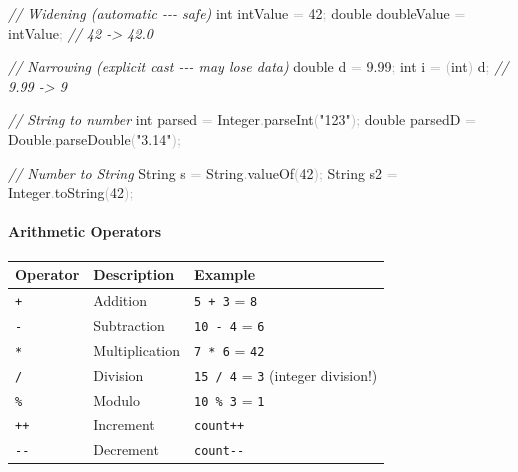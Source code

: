 \documentclass[
  justified,
  openright,
]{tufte-book}
\let\subsection\paragraph
\let\paragraph\paragraph
\newcommand{\StringTok}[1]{\textcolor{CodeString}{#1}}              %
\newcommand{\CommentTok}[1]{\textcolor{CodeComment}{\textit{#1}}}  %
\newcommand{\CodeNumTok}[1]{\textcolor{CodeNumber}{#1}}             %
\newcommand{\CodeFuncTok}[1]{\textcolor{CodeKeyword}{#1}}           %
\newcommand{\CodeTypeTok}[1]{\textcolor{CodeType}{#1}}              %
\newcommand{\OperatorTok}[1]{\textcolor{DarkGray}{#1}}              %
\newenvironment{Shaded}{%
  \begin{mdframed}[style=TufteCode]%
}{%
  \end{mdframed}%
}
\let\subsection\paragraph
\let\paragraph\paragraph
\begin{document}
\begin{Shaded}
\begin{Highlighting}[]
\CommentTok{// Widening (automatic {-}{-}{-} safe)}
\CodeTypeTok{int} intValue \OperatorTok{=} \CodeNumTok{42}\OperatorTok{;}
\CodeTypeTok{double} doubleValue \OperatorTok{=} intValue\OperatorTok{;}   \CommentTok{// 42 {-}\textgreater{} 42.0}
 
\CommentTok{// Narrowing (explicit cast {-}{-}{-} may lose data)}
\CodeTypeTok{double} d \OperatorTok{=} \CodeNumTok{9.99}\OperatorTok{;}
\CodeTypeTok{int} i \OperatorTok{=} \OperatorTok{(}\CodeTypeTok{int}\OperatorTok{)} d\OperatorTok{;}                 \CommentTok{// 9.99 {-}\textgreater{} 9}
 
\CommentTok{// String to number}
\CodeTypeTok{int} parsed \OperatorTok{=} Integer\OperatorTok{.}\CodeFuncTok{parseInt}\OperatorTok{(}\StringTok{"123"}\OperatorTok{);}
\CodeTypeTok{double} parsedD \OperatorTok{=} Double\OperatorTok{.}\CodeFuncTok{parseDouble}\OperatorTok{(}\StringTok{"3.14"}\OperatorTok{);}
 
\CommentTok{// Number to String}
String s \OperatorTok{=} String\OperatorTok{.}\CodeFuncTok{valueOf}\OperatorTok{(}\CodeNumTok{42}\OperatorTok{);}
String s2 \OperatorTok{=} Integer\OperatorTok{.}\CodeFuncTok{toString}\OperatorTok{(}\CodeNumTok{42}\OperatorTok{);}
\end{Highlighting}
\end{Shaded}

\subsection{Arithmetic Operators}\label{arithmetic-operators-1}

\begin{fullwidth}{\def\LTcaptype{none} %
\begin{longtable}[]{@{}lll@{}}
\toprule\noalign{}
Operator & Description & Example \\
\midrule\noalign{}
\endhead
\bottomrule\noalign{}
\endlastfoot
\texttt{+} & Addition & \texttt{5\ +\ 3} = \texttt{8} \\
\texttt{-} & Subtraction & \texttt{10\ -\ 4} = \texttt{6} \\
\texttt{*} & Multiplication & \texttt{7\ *\ 6} = \texttt{42} \\
\texttt{/} & Division & \texttt{15\ /\ 4} = \texttt{3} (integer
division!) \\
\texttt{\%} & Modulo & \texttt{10\ \%\ 3} = \texttt{1} \\
\texttt{++} & Increment & \texttt{count++} \\
\texttt{-\/-} & Decrement & \texttt{count-\/-} \\
\end{longtable}
}
\end{fullwidth}
\end{document}
